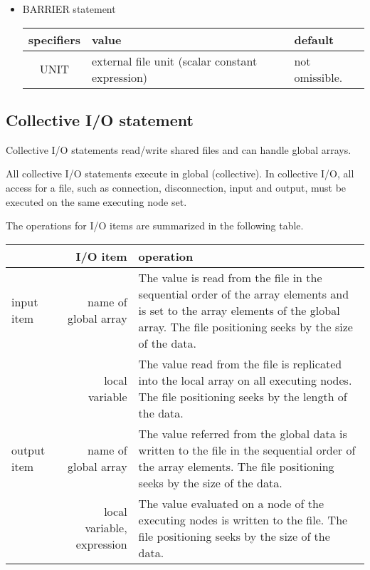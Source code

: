    
   \begin{itemize}
     \item BARRIER statement

   \begin{table}[h]
    \begin{center}
     \label{tb:globalopen}
     \begin{tabular}{|c||p{90mm}|l|}
       \hline
       specifiers & value & default \\ \hline \hline
       UNIT & external file unit (scalar constant expression)
       & not omissible. \\ \hline
     \end{tabular}
    \end{center}
   \end{table}

   \end{itemize}

   
   \subsection{Collective I/O statement}

   Collective I/O statements read/write shared files and can handle global arrays.

   All collective I/O statements execute in global (collective).
   In collective I/O, all access for a file, such as connection, disconnection,
   input and output, must be executed on the same executing node set. 
   
   The operations for I/O items are summarized in the following table.

   \begin{table}[h]
    \begin{center}
     \begin{tabular}{|l|r|p{80mm}|}
      \hline
      \multicolumn{1}{|c}{ }  & {\bf I/O item} & {\bf operation} \\ \hline
      input item & name of global array & The value is read from the file in the sequential order of the array elements and is set to the array elements of the global array.
      The file positioning seeks by the size of the data.
      \\
      \cline{2-3}
      & local variable &  The value read from the file is replicated into the
	      local array on all executing nodes. The file positioning seeks by
	      the length of the data. \\ \hline
      output item & name of global array & The value referred from the global data 
	      is written to the file in the sequential order of the array elements.
	      The file positioning seeks by the size of the data. \\
      \cline{2-3}
      & local variable, expression & The value evaluated on a node of the executing nodes is written to the file.
      The file positioning seeks by the size of the data. \\ \hline
      \end{tabular}
     \end{center}
    \label{tb:aaa}
   \end{table}

